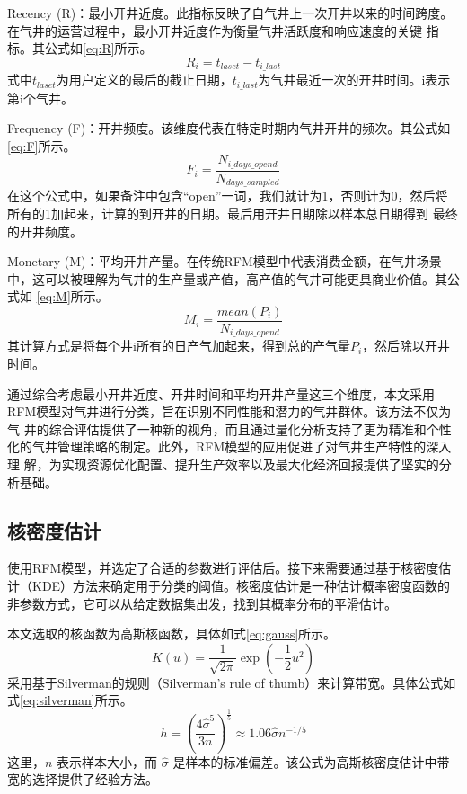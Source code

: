 Recency (R)：最小开井近度。此指标反映了自气井上一次开井以来的时间跨度。在气井的运营过程中，最小开井近度作为衡量气井活跃度和响应速度的关键
指标。其公式如\eqref{eq:R}所示。
\begin{equation}
    R_i = t_{laset} - t_{i\_last}
    \label{eq:R}
\end{equation}
式中$t_{laset}$为用户定义的最后的截止日期，$t_{i\_last}$为气井最近一次的开井时间。i表示第i个气井。

Frequency (F)：开井频度。该维度代表在特定时期内气井开井的频次。其公式如\eqref{eq:F}所示。
\begin{equation}
    F_i=\frac{N_{i\_days\_opend}}{N_{days\_sampled}}
    \label{eq:F}
\end{equation}
在这个公式中，如果备注中包含“open”一词，我们就计为1，否则计为0，然后将所有的1加起来，计算的到开井的日期。最后用开井日期除以样本总日期得到
最终的开井频度。

Monetary (M)：平均开井产量。在传统RFM模型中代表消费金额，在气井场景中，这可以被理解为气井的生产量或产值，高产值的气井可能更具商业价值。其公式如
\eqref{eq:M}所示。
\begin{equation}
    M_i = \frac{mean(P_i)}{N_{i\_days\_opend}}
    \label{eq:M}
\end{equation}
其计算方式是将每个井i所有的日产气加起来，得到总的产气量$P_i$，然后除以开井时间。

通过综合考虑最小开井近度、开井时间和平均开井产量这三个维度，本文采用RFM模型对气井进行分类，旨在识别不同性能和潜力的气井群体。该方法不仅为气
井的综合评估提供了一种新的视角，而且通过量化分析支持了更为精准和个性化的气井管理策略的制定。此外，RFM模型的应用促进了对气井生产特性的深入理
解，为实现资源优化配置、提升生产效率以及最大化经济回报提供了坚实的分析基础。
\subsection{核密度估计}
使用RFM模型，并选定了合适的参数进行评估后。接下来需要通过基于核密度估计（KDE）方法来确定用于分类的阈值。核密度估计是一种估计概率密度函数的非参数方式，它可以从给定数据集出发，找到其概率分布的平滑估计。

本文选取的核函数为高斯核函数，具体如式\eqref{eq:gauss}所示。
\begin{equation}
    K(u) = \frac{1}{\sqrt{2\pi}} \exp\left(-\frac{1}{2} u^2\right)
    \label{eq:gauss}
\end{equation}
采用基于Silverman的规则（Silverman's rule of thumb）来计算带宽。具体公式如式\eqref{eq:silverman}所示。
\begin{equation}
    h = \left(\frac{4\hat{\sigma}^5}{3n}\right)^{\frac{1}{5}} \approx 1.06 \hat{\sigma} n^{-1/5}
    \label{eq:silverman}
\end{equation}
这里，\( n \) 表示样本大小，而 \( \hat{\sigma} \) 是样本的标准偏差。该公式为高斯核密度估计中带宽的选择提供了经验方法。

